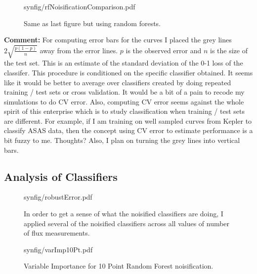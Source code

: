 \documentclass[10pt]{article}
\begin{document}
\begin{figure}[H]
  \begin{center}
    \begin{includegraphics}[height=4in,width=4in]{synfig/rfNoisificationComparison.pdf}
      \caption{Same as last figure but using random forests.\label{fig:rfNoisificationComparisonSyn}}
    \end{includegraphics}
  \end{center}
\end{figure}


\textbf{Comment:} For computing error bars for the curves I placed the grey lines $2\sqrt{\frac{p(1-p)}{n}}$ away from the error lines. $p$ is the observed error and $n$ is the size of the test set. This is an estimate of the standard deviation of the 0-1 loss of the classifer. This procedure is conditioned on the specific classifier obtained. It seems like it would be better to average over classifiers created by doing repeated training / test sets or cross validation. It would be a bit of a pain to recode my simulations to do CV error. Also, computing CV error seems against the whole spirit of this enterprise which is to study classification when training / test sets are different. For example, if I am training on well sampled curves from Kepler to classify ASAS data, then the concept using CV error to estimate performance is a bit fuzzy to me. Thoughts? Also, I plan on turning the grey lines into vertical bars.


\subsection{Analysis of Classifiers}

\begin{figure}[H]
  \begin{center}
    \begin{includegraphics}[height=4in,width=4in]{synfig/robustError.pdf}
      \caption{In order to get a sense of what the noisified classifiers are doing, I applied several of the noisified classifiers across all values of number of flux measurements.\label{fig:robustErrorSyn}}
    \end{includegraphics}
  \end{center}
\end{figure}




\begin{figure}[H]
  \begin{center}
    \begin{includegraphics}[height=4in,width=4in]{synfig/varImp10Pt.pdf}
      \caption{Variable Importance for 10 Point Random Forest noisification.\label{fig:varImp10Pt}}
    \end{includegraphics}
    \end{center}
  \end{figure}
  
\end{document}
